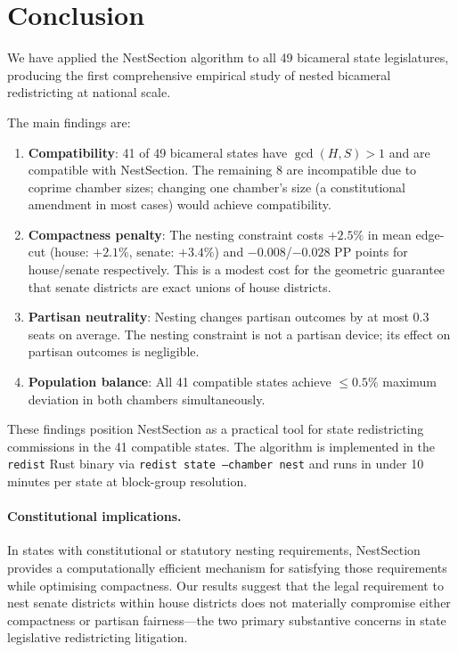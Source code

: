 \section{Conclusion}
\label{sec:conclusion}

We have applied the NestSection algorithm to all 49 bicameral state legislatures,
producing the first comprehensive empirical study of nested bicameral redistricting
at national scale.

The main findings are:
\begin{enumerate}
  \item \textbf{Compatibility}: 41 of 49 bicameral states have
    $\gcd(H,S) > 1$ and are compatible with NestSection. The remaining
    8 are incompatible due to coprime chamber sizes; changing one
    chamber's size (a constitutional amendment in most cases) would achieve
    compatibility.
  \item \textbf{Compactness penalty}: The nesting constraint costs $+2.5\%$
    in mean edge-cut (house: $+2.1\%$, senate: $+3.4\%$) and
    $-0.008$/$-0.028$ PP points for house/senate respectively.
    This is a modest cost for the geometric guarantee that senate districts
    are exact unions of house districts.
  \item \textbf{Partisan neutrality}: Nesting changes partisan outcomes by
    at most $0.3$ seats on average. The nesting constraint is not a partisan
    device; its effect on partisan outcomes is negligible.
  \item \textbf{Population balance}: All 41 compatible states achieve
    $\leq 0.5\%$ maximum deviation in both chambers simultaneously.
\end{enumerate}

These findings position NestSection as a practical tool for state redistricting
commissions in the 41 compatible states. The algorithm is implemented in the
\texttt{redist} Rust binary via \texttt{redist state --chamber nest} and
runs in under 10 minutes per state at block-group resolution.

\paragraph{Constitutional implications.}
In states with constitutional or statutory nesting requirements, NestSection
provides a computationally efficient mechanism for satisfying those requirements
while optimising compactness. Our results suggest that the legal requirement
to nest senate districts within house districts does not materially compromise
either compactness or partisan fairness---the two primary substantive concerns
in state legislative redistricting litigation.

